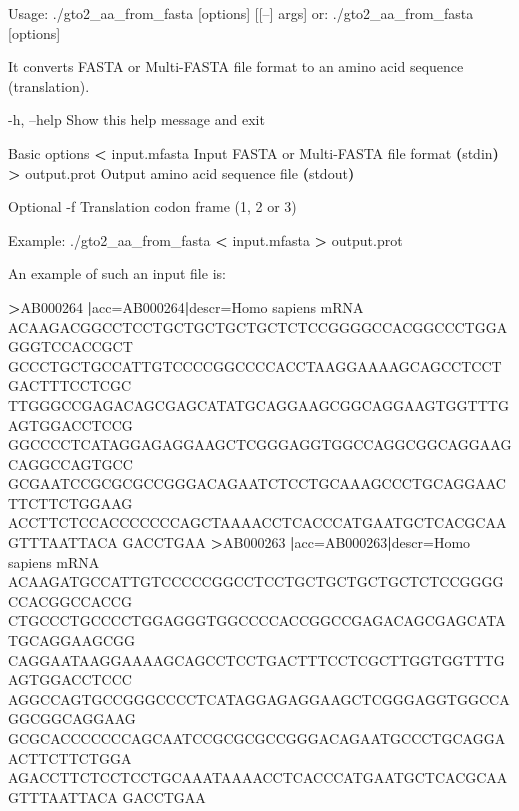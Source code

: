 \documentclass[11pt,]{krantz}
\newenvironment{Shaded}{\begin{snugshade}}{\end{snugshade}}
\newcommand{\KeywordTok}[1]{\textcolor[rgb]{0.27,0.27,0.27}{\textbf{#1}}}
\newcommand{\VariableTok}[1]{\textcolor[rgb]{0,0,0}{#1}}
\newcommand{\OperatorTok}[1]{\textcolor[rgb]{0.43,0.43,0.43}{\textbf{#1}}}
\newcommand{\ExtensionTok}[1]{#1}
\newcommand{\NormalTok}[1]{#1}
\begin{document}
\begin{Shaded}
\begin{Highlighting}[]
\ExtensionTok{Usage}\NormalTok{: ./gto2_aa_from_fasta [options] [[--] args]}
   \ExtensionTok{or}\NormalTok{: ./gto2_aa_from_fasta [options]}

\ExtensionTok{It}\NormalTok{ converts FASTA or Multi-FASTA file format to an amino }
\ExtensionTok{acid}\NormalTok{ sequence (translation)}\ExtensionTok{.}

    \ExtensionTok{-h}\NormalTok{, --help        Show this help message and exit}

\ExtensionTok{Basic}\NormalTok{ options}
    \OperatorTok{<} \ExtensionTok{input.mfasta}\NormalTok{    Input FASTA or Multi-FASTA file format }
                      \KeywordTok{(}\ExtensionTok{stdin}\KeywordTok{)}
    \OperatorTok{>} \ExtensionTok{output.prot}\NormalTok{     Output amino acid sequence file }
                      \KeywordTok{(}\ExtensionTok{stdout}\KeywordTok{)}

\ExtensionTok{Optional}
    \ExtensionTok{-f}\NormalTok{                Translation codon frame (1, 2 or 3)}

\ExtensionTok{Example}\NormalTok{: ./gto2_aa_from_fasta }\OperatorTok{<}\NormalTok{ input.mfasta }\OperatorTok{>}\NormalTok{ output.prot}
\end{Highlighting}
\end{Shaded}

An example of such an input file is:

\begin{Shaded}
\begin{Highlighting}[]
\OperatorTok{>}\ExtensionTok{AB000264} \KeywordTok{|}\VariableTok{acc=}\NormalTok{AB000264}\KeywordTok{|}\VariableTok{descr=}\NormalTok{Homo }\ExtensionTok{sapiens}\NormalTok{ mRNA }
\ExtensionTok{ACAAGACGGCCTCCTGCTGCTGCTGCTCTCCGGGGCCACGGCCCTGGAGGGTCCACCGCT}
\ExtensionTok{GCCCTGCTGCCATTGTCCCCGGCCCCACCTAAGGAAAAGCAGCCTCCTGACTTTCCTCGC}
\ExtensionTok{TTGGGCCGAGACAGCGAGCATATGCAGGAAGCGGCAGGAAGTGGTTTGAGTGGACCTCCG}
\ExtensionTok{GGCCCCTCATAGGAGAGGAAGCTCGGGAGGTGGCCAGGCGGCAGGAAGCAGGCCAGTGCC}
\ExtensionTok{GCGAATCCGCGCGCCGGGACAGAATCTCCTGCAAAGCCCTGCAGGAACTTCTTCTGGAAG}
\ExtensionTok{ACCTTCTCCACCCCCCCAGCTAAAACCTCACCCATGAATGCTCACGCAAGTTTAATTACA}
\ExtensionTok{GACCTGAA}
\OperatorTok{>}\ExtensionTok{AB000263} \KeywordTok{|}\VariableTok{acc=}\NormalTok{AB000263}\KeywordTok{|}\VariableTok{descr=}\NormalTok{Homo }\ExtensionTok{sapiens}\NormalTok{ mRNA }
\ExtensionTok{ACAAGATGCCATTGTCCCCCGGCCTCCTGCTGCTGCTGCTCTCCGGGGCCACGGCCACCG}
\ExtensionTok{CTGCCCTGCCCCTGGAGGGTGGCCCCACCGGCCGAGACAGCGAGCATATGCAGGAAGCGG}
\ExtensionTok{CAGGAATAAGGAAAAGCAGCCTCCTGACTTTCCTCGCTTGGTGGTTTGAGTGGACCTCCC}
\ExtensionTok{AGGCCAGTGCCGGGCCCCTCATAGGAGAGGAAGCTCGGGAGGTGGCCAGGCGGCAGGAAG}
\ExtensionTok{GCGCACCCCCCCAGCAATCCGCGCGCCGGGACAGAATGCCCTGCAGGAACTTCTTCTGGA}
\ExtensionTok{AGACCTTCTCCTCCTGCAAATAAAACCTCACCCATGAATGCTCACGCAAGTTTAATTACA}
\ExtensionTok{GACCTGAA}
\end{Highlighting}
\end{Shaded}
\end{document}
